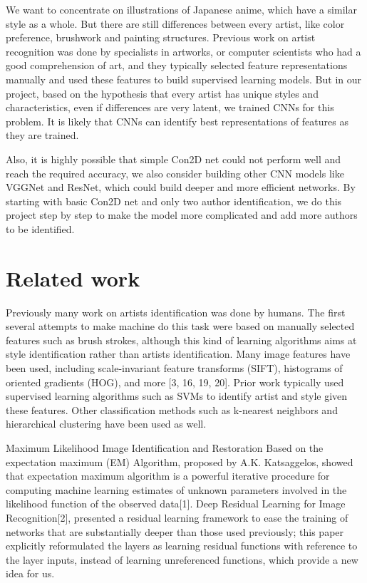 \documentclass{article}
\begin{document}
We want to concentrate on illustrations of Japanese anime, which have a similar style as a whole. But there are still differences between every artist, like color preference, brushwork and painting structures. Previous work on artist recognition was done by specialists in artworks, or computer scientists who had a good comprehension of art, and they typically selected feature representations manually and used these features to build supervised learning models. But in our project, based on the hypothesis that every artist has unique styles and characteristics, even if differences are very latent, we trained CNNs for this problem. It is likely that CNNs can identify best representations of features as they are trained.

Also, it is highly possible that simple Con2D net could not perform well and reach the required accuracy, we also consider building other CNN models like VGGNet and ResNet, which could build deeper and more efficient networks. By starting with basic Con2D net and only two author identification, we do this project step by step to make the model more complicated and add more authors to be identified.


\section{Related work}

Previously many work on artists identification was done by humans. The first several attempts to make machine do this task were based on manually selected features such as brush strokes, although this kind of learning algorithms aims at style identification rather than artists identification. Many image features have been used, including scale-invariant feature transforms (SIFT), histograms of oriented gradients (HOG), and more [3, 16, 19, 20]. Prior work typically used supervised learning algorithms such as SVMs to identify artist and style given these features. Other classification methods such as k-nearest neighbors and hierarchical clustering have been used as well.

Maximum Likelihood Image Identification and Restoration Based on the expectation maximum (EM) Algorithm, proposed by A.K. Katsaggelos, showed that expectation maximum algorithm is a powerful iterative procedure for computing machine learning estimates of unknown parameters involved in the likelihood function of the observed data[1]. Deep Residual Learning for Image Recognition[2], presented a residual learning framework to ease the training of networks that are substantially deeper than those used previously; this paper explicitly reformulated the layers as learning residual functions with reference to the layer inputs, instead of learning unreferenced functions, which provide a new idea for us.
\end{document}
